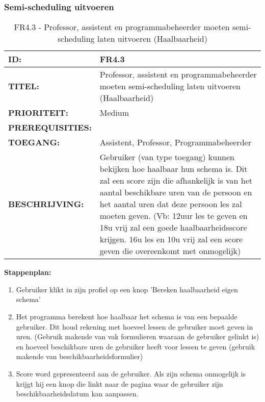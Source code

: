 \subsubsection{Semi-scheduling uitvoeren}
\noindent\begin{table}[H]
	\begin{tabular}{l | p{10cm}}
    \textbf{ID:} & FR4.3 \\ \hline
    \textbf{TITEL:} & Professor, assistent en programmabeheerder moeten semi-scheduling laten uitvoeren (Haalbaarheid)\\ \hline
    \textbf{PRIORITEIT:} &  Medium \\ \hline
    \textbf{PREREQUISITIES:} & \\ \hline
    \textbf{TOEGANG:} & Assistent, Professor, Programmabeheerder \\ \hline
    \textbf{BESCHRIJVING:} & Gebruiker (van type toegang) kunnen bekijken hoe haalbaar hun schema is. Dit zal een score zijn die afhankelijk is van het aantal beschikbare uren van de persoon en het aantal uren dat deze persoon les zal moeten geven. (Vb: 12uur les te geven en 18u vrij zal een goede haalbaarheidsscore krijgen. 16u les en 10u vrij zal een score geven die overeenkomt met onmogelijk)\\
    \end{tabular}
    \caption{FR4.3 - Professor, assistent en programmabeheerder moeten semi-scheduling laten uitvoeren (Haalbaarheid)}
    \label{tab:FR4.3 - Professor, assistent en programmabeheerder moeten semi-scheduling laten uitvoeren (Haalbaarheid)}
\end{table}

\textbf{Stappenplan:}
	\begin{enumerate}
	\item Gebruiker klikt in zijn profiel op een knop 'Bereken haalbaarheid eigen schema'
	\item Het programma berekent hoe haalbaar het schema is van een bepaalde gebruiker. Dit houd rekening met hoeveel lessen de gebruiker moet geven in uren. (Gebruik makende van vak formulieren waaraan de gebruiker gelinkt is) en hoeveel beschikbare uren de gebruiker heeft voor lessen te geven (gebruik makende van beschikbaarheidsformulier)
	\item Score word gepresenteerd aan de gebruiker. Als zijn schema onmogelijk is krijgt hij een knop die linkt naar de pagina waar de gebruiker zijn beschikbaarheidsdatum kan aanpassen.
	\end{enumerate}
        
